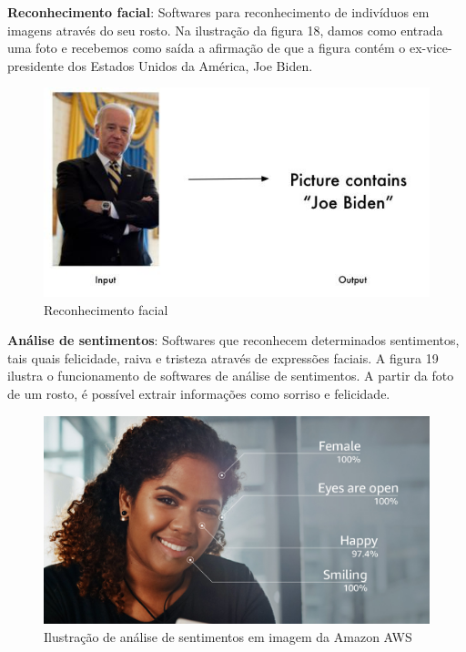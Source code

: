 \documentclass{article}
\begin{document}
\textbf{Reconhecimento facial}: Softwares para reconhecimento de indivíduos em imagens através do seu rosto. Na ilustração da figura 18, damos como entrada uma foto e recebemos como saída a afirmação de que a figura contém o ex-vice-presidente dos Estados Unidos da América, Joe Biden. \\
\begin{figure}[H]
    \centering
    \includegraphics[scale=0.5]{imagens/reconhecimento_facial.jpg}
    \caption{Reconhecimento facial}
    \label{fig:reconhecimento_facial}
\end{figure}{}
\textbf{Análise de sentimentos}: Softwares que reconhecem determinados sentimentos, tais quais felicidade, raiva e tristeza através de expressões faciais. A figura 19 ilustra o funcionamento de softwares de análise de sentimentos. A partir da foto de um rosto, é possível extrair informações como sorriso e felicidade.\\
\begin{figure}[H]
    \centering
    \includegraphics[scale=0.19]{imagens/analise_facial.jpg}
    \caption{Ilustração de análise de sentimentos em imagem da Amazon AWS}
    \label{fig:imagem_sentimentos}
\end{figure}{}
\end{document}
